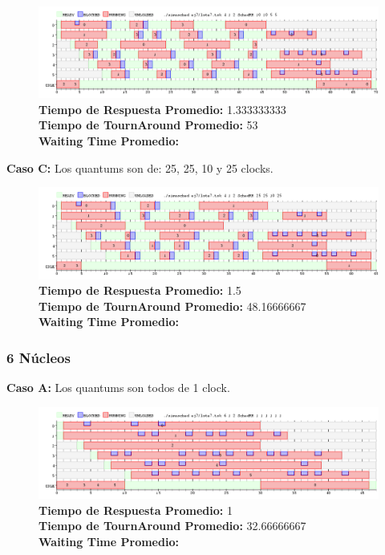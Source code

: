 \documentclass[a4paper]{article}
\begin{document}
			 \begin{figure}[h!]
   \begin{center}
 	\includegraphics[scale=0.5]{imagenes/ej7/4nucleoB.png}
 	\textbf{Tiempo de Respuesta Promedio:} 1.333333333 \\
 	\textbf{Tiempo de TournAround Promedio:} 53 \\
 	\textbf{Waiting Time Promedio:} \\
   \end{center}
 \end{figure} 
 
	\textbf{Caso C:}  Los quantums son de: 25, 25, 10 y 25 clocks.
	
			 \begin{figure}[h!]
   \begin{center}
 	\includegraphics[scale=0.5]{imagenes/ej7/4nucleoC.png}
 	\textbf{Tiempo de Respuesta Promedio:} 1.5 \\
 	\textbf{Tiempo de TournAround Promedio:} 48.16666667 \\
 	\textbf{Waiting Time Promedio:} \\
   \end{center}
 \end{figure} 
 
 \newpage
	\subsubsection*{6 N\'ucleos}
	
	\textbf{Caso A:}  Los quantums son todos de 1 clock.

		 \begin{figure}[h!]
   \begin{center}
 	\includegraphics[scale=0.5]{imagenes/ej7/6nucleoA.png}
 	\textbf{Tiempo de Respuesta Promedio:} 1 \\
 	\textbf{Tiempo de TournAround Promedio:} 32.66666667 \\
 	\textbf{Waiting Time Promedio:} \\
   \end{center}
 \end{figure} 
 	
\end{document}
